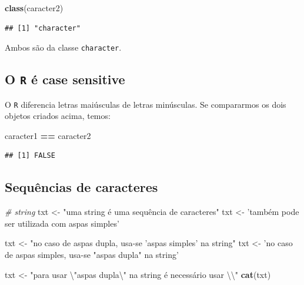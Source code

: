 \documentclass[]{book}
\newenvironment{Shaded}{\begin{snugshade}}{\end{snugshade}}
\newcommand{\CharTok}[1]{\textcolor[rgb]{0.31,0.60,0.02}{#1}}
\newcommand{\CommentTok}[1]{\textcolor[rgb]{0.56,0.35,0.01}{\textit{#1}}}
\newcommand{\KeywordTok}[1]{\textcolor[rgb]{0.13,0.29,0.53}{\textbf{#1}}}
\newcommand{\NormalTok}[1]{#1}
\newcommand{\OperatorTok}[1]{\textcolor[rgb]{0.81,0.36,0.00}{\textbf{#1}}}
\newcommand{\StringTok}[1]{\textcolor[rgb]{0.31,0.60,0.02}{#1}}
\begin{document}
\begin{Shaded}
\begin{Highlighting}[]
\KeywordTok{class}\NormalTok{(caracter2)}
\end{Highlighting}
\end{Shaded}

\begin{verbatim}
## [1] "character"
\end{verbatim}

Ambos são da classe \texttt{character}.

\hypertarget{o-r-uxe9-case-sensitive}{%
\subsection{\texorpdfstring{O \texttt{R} é case sensitive}{O R é case sensitive}}\label{o-r-uxe9-case-sensitive}}

O \texttt{R} diferencia letras maiúsculas de letras minúsculas. Se compararmos os dois objetos criados acima, temos:

\begin{Shaded}
\begin{Highlighting}[]
\NormalTok{caracter1 }\OperatorTok{==}\StringTok{ }\NormalTok{caracter2}
\end{Highlighting}
\end{Shaded}

\begin{verbatim}
## [1] FALSE
\end{verbatim}

\hypertarget{sequuxeancias-de-caracteres}{%
\subsection{Sequências de caracteres}\label{sequuxeancias-de-caracteres}}

\begin{Shaded}
\begin{Highlighting}[]
\CommentTok{# string}
\NormalTok{txt <-}\StringTok{ "uma string é uma sequência de caracteres"}
\NormalTok{txt <-}\StringTok{ 'também pode ser utilizada com aspas simples'}

\NormalTok{txt <-}\StringTok{ "no caso de aspas dupla, usa-se 'aspas simples' na string"}
\NormalTok{txt <-}\StringTok{ 'no caso de aspas simples, usa-se "aspas dupla" na string'}
\end{Highlighting}
\end{Shaded}

\begin{Shaded}
\begin{Highlighting}[]
\NormalTok{txt <-}\StringTok{ "para usar }\CharTok{\textbackslash{}"}\StringTok{aspas dupla}\CharTok{\textbackslash{}"}\StringTok{ na string é necessário usar }\CharTok{\textbackslash{}\textbackslash{}}\StringTok{"}
\KeywordTok{cat}\NormalTok{(txt) }
\end{Highlighting}
\end{Shaded}
\end{document}
